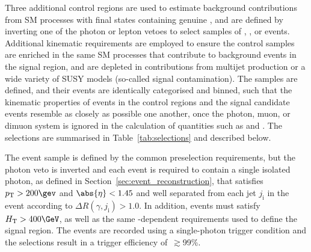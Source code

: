 Three additional control regions are used to estimate background
contributions from SM processes with final states containing genuine
\ptvecmiss, and are defined by inverting one of the photon or lepton
vetoes to select samples of \gj, \mj, or \mmj events. Additional
kinematic requirements are employed to ensure the control samples are
enriched in the same SM processes that contribute to background events
in the signal region, and are depleted in contributions from multijet
production or a wide variety of SUSY models (\ie so-called signal
contamination).  The samples are defined, and their events are
identically categorised and binned, such that the kinematic properties
of events in the control regions and the signal candidate events
resemble as closely as possible one another, once the photon, muon, or
dimuon system is ignored in the calculation of quantities such as
\scalht and \HTmiss. The selections are summarised in
Table~\ref{tab:selections} and described below.

The \gj event sample is defined by the common preselection
requirements, but the photon veto is inverted and each event is
required to contain a single isolated photon, as defined in
Section~\ref{sec:event_reconstruction}, that satisfies $\Pt > 200\gev$
and $\abs{\eta} < 1.45$ and well separated from each jet
$j_{\text{i}}$ in the event according to $\Delta
R(\gamma,j_{\text{i}}) > 1.0$. 
In addition, events must satisfy $\scalht > 400\GeV$, as well as the
same \scalht-dependent \alphat requirements used to define the signal
region. The events are recorded using a single-photon trigger
condition and the selections result in a trigger efficiency
of~$\gtrsim$99\%.


